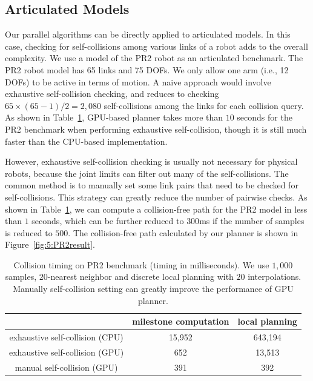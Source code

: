 \subsection{Articulated Models}
Our parallel algorithms can be directly applied to articulated models. In this case, checking for self-collisions among
various links of a robot adds to the overall complexity. We use a model of the PR2 robot as an articulated
benchmark. The PR2 robot model has 65 links and 75 DOFs. We only allow one arm (i.e., 12 DOFs) to be active in terms
of motion. A naive approach would involve exhaustive self-collision checking, and reduces to checking
$65 \times (65-1)/2 = 2,080$ self-collisions among the links for each collision query.
As shown in Table~\ref{tab:5:selfcollision}, GPU-based planner takes more than $10$ seconds for the PR2 benchmark when
performing exhaustive self-collision, though it is still much faster than the CPU-based implementation.

However, exhaustive self-collision checking is usually not necessary for  physical robots, because the joint limits can
filter out many of the self-collisions. The common method is to manually set some link pairs that need to be checked
for self-collisions. This strategy can greatly reduce the number of pairwise checks. As shown in Table~\ref{tab:5:selfcollision}, we can compute a collision-free path for the PR2 model in less than $1$ seconds, which can be further reduced to $300$ms if
the number of samples is reduced to $500$. The collision-free path calculated by our planner is shown in Figure~\ref{fig:5:PR2result}.


\begin{table}[htb]
\begin{center}
\begin{tabular}{|c|c|c|} \hline
                                & milestone computation & local planning \\ \hline
exhaustive self-collision (CPU) & 15,952 & 643,194 \\ \hline
exhaustive self-collision (GPU) & 652 & 13,513 \\ \hline
manual self-collision (GPU) & 391 & 392 \\ \hline
\end{tabular}
\end{center}
\caption[Comparison of the collision timing on PR2 benchmark when using CPU-based and GPU-based collision checking algorithms]{Collision timing on PR2 benchmark (timing in milliseconds). We use $1,000$ samples, $20$-nearest neighbor and discrete local planning with $20$ interpolations. Manually self-collision setting can greatly improve the performance of GPU planner. }\label{tab:5:selfcollision}
\end{table}


